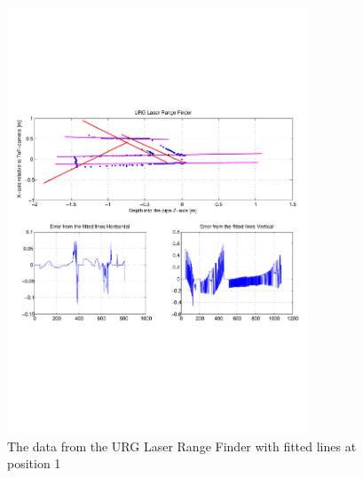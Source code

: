 \begin{figure}[htbp]
    \centering
    \includegraphics[width=0.8\textwidth]{pics/longpipe-urg-2d}
    \caption{The data from the URG Laser Range Finder with fitted lines at position 1}
    \label{chap7:fig-longpipe-urg-2d}
\end{figure}

